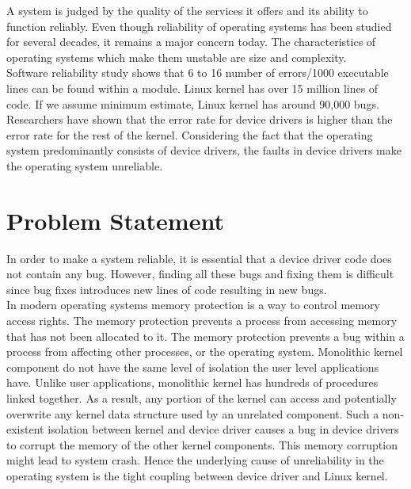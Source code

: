 
A system is judged by the quality of the services it offers and its ability to function reliably. Even though reliability of operating systems has been studied for several decades, it remains a major concern today. The characteristics of operating systems which make them unstable are size and complexity. 
\\
Software reliability study shows that 6 to 16 number of errors/1000 executable lines can be found within a module\cite{Basili:1984:SEC:69605.2085}\cite{Tanenbaum06canwe}. Linux kernel has over 15 million lines of code. If we assume minimum estimate, Linux kernel has around 90,000 bugs. Researchers have shown that the error rate for device drivers is higher than the error rate for the rest of the kernel\cite{Chou:2001:ESO:502034.502042}. Considering the fact that the operating system predominantly consists of device drivers, the faults in device drivers make the operating system unreliable\cite{Chou:2001:ESO:502034.502042}.

\pagebreak

\section {Problem Statement}

In order to make a system reliable, it is essential that a device driver code does not contain any bug. However, finding all these bugs and fixing them is difficult since bug fixes introduces new lines of code resulting in new bugs. 
\\
In modern operating systems memory protection is a way to control memory access rights. The memory protection prevents a process from accessing memory that has not been allocated to it. The memory protection prevents a bug within a process from affecting other processes, or the operating system\cite{Denning:1970:VM:356571.356573}\cite{Galvin}. Monolithic kernel component do not have the same level of isolation the user level applications have. Unlike user applications, monolithic kernel has hundreds of procedures linked together. As a result, any portion of the kernel can access and potentially overwrite any kernel data structure used by an unrelated component. Such a non-existent isolation between kernel and device driver causes a bug in device drivers to corrupt the memory of the other kernel components. This memory corruption might lead to system crash. Hence the underlying cause of unreliability in the operating system is the tight coupling between device driver and Linux kernel.

